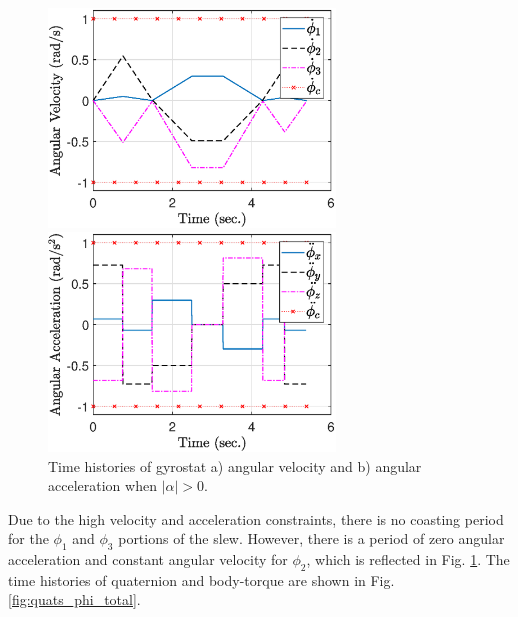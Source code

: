 \documentclass[journal ]{new-aiaa}
\begin{document}
\begin{figure}[hbt!]
    \centering
    \begin{minipage}{.5\textwidth}
        \centering
    \includegraphics[width=3in]{figures/alphaNot0/ang_vel_phi_total.eps}
    \end{minipage}%
    \begin{minipage}{0.5\textwidth}
        \centering
        \includegraphics[width=3in]{figures/alphaNot0/ang_accel_total.eps}
    \end{minipage}
    \caption{Time histories of gyrostat a) angular velocity and b) angular acceleration when $|\alpha|>0$.}
    \label{fig:ang_vel_acc} 
\end{figure}
Due to the high velocity and acceleration constraints, there is no coasting period for the $\phi_1$ and $\phi_3$ portions of the slew. However, there is a period of zero angular acceleration and constant angular velocity for $\phi_2$, which is reflected in Fig. \ref{fig:ang_vel_acc}. The time histories of quaternion and body-torque are shown in Fig. \ref{fig:quats_phi_total}.
\end{document}

